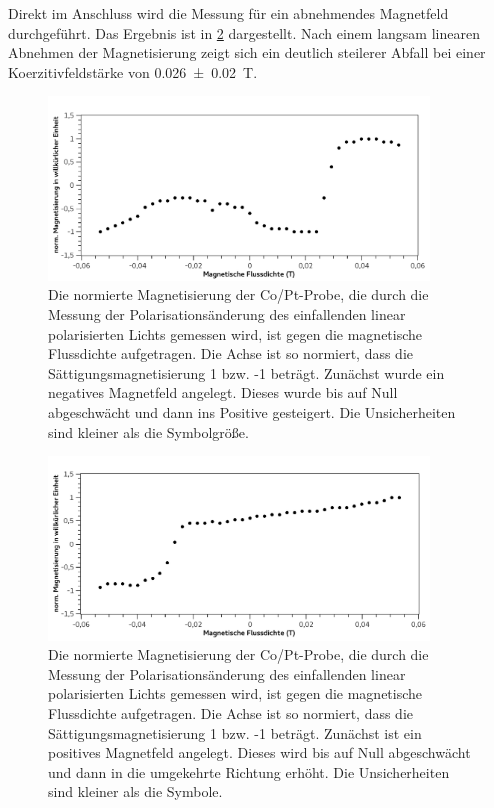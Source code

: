 \documentclass[
	a4paper,
	12pt,
	pagesize,
	ngerman
]{scrartcl}
\begin{document}
	Direkt im Anschluss wird die Messung für ein abnehmendes Magnetfeld durchgeführt.
	Das Ergebnis ist in \cref{fig_magn2} dargestellt.
	Nach einem langsam linearen Abnehmen der Magnetisierung zeigt sich ein deutlich steilerer Abfall bei einer Koerzitivfeldstärke von \SI{0,026+-0,02}{T}. 
	

	\begin{figure}[H]  
		\includegraphics[width=0.90\textwidth]{fig_magn1} 
		\centering
		\caption{Die normierte Magnetisierung der Co/Pt-Probe, die durch die Messung der Polarisationsänderung des einfallenden linear polarisierten Lichts gemessen wird, ist gegen die magnetische Flussdichte aufgetragen. 
		Die Achse ist so normiert, dass die Sättigungsmagnetisierung 1 bzw. -1 beträgt.
		Zunächst wurde ein negatives Magnetfeld angelegt. 
		Dieses wurde bis auf Null abgeschwächt und dann ins Positive gesteigert. 
		Die Unsicherheiten sind kleiner als die Symbolgröße.} 
		\label{fig_magn1}
		\centering
	\end{figure}
	
	\begin{figure}[H] 
		\includegraphics[width=0.90\textwidth]{fig_magn2}
		\centering
		\caption{Die normierte Magnetisierung der Co/Pt-Probe, die durch die Messung der Polarisationsänderung des einfallenden linear polarisierten Lichts gemessen wird, ist gegen die magnetische Flussdichte aufgetragen. 
		Die Achse ist so normiert, dass die Sättigungsmagnetisierung 1 bzw. -1 beträgt.
		Zunächst ist ein positives Magnetfeld angelegt. 
		Dieses wird bis auf Null abgeschwächt und dann in die umgekehrte Richtung erhöht.
		Die Unsicherheiten sind kleiner als die Symbole.} 
		\label{fig_magn2}
		\centering
	\end{figure}
\end{document}
